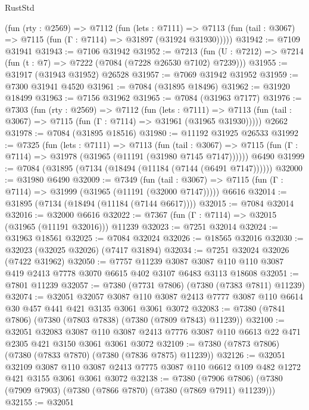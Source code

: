\begin{lexlean}{RustStd}
\begin{coremodule}
    (fun (rty : @2569) =>
    @7112
      (fun (lets : @7111) =>
      @7113 (fun (tail : @3067) => @7115 (fun (Γ : @7114) => @31897 (@31924 @31930)))))
@31942 := @7109 @31941
@31943 := @7106 @31942
@31952 := @7213
    (fun (U : @7212) => @7214 (fun (t : @7) => @7222 (@7084 (@7228 @26530 @7102) @7239)))
@31955 := @31917 (@31943 @31952) @26528
@31957 := @7069 @31942 @31952
@31959 := @7300 @31941 @4520
@31961 := @7084 (@31895 @18496)
@31962 := @31920 @18499
@31963 := @7156 @31962
@31965 := @7084 (@31963 @7177)
@31976 := @7303
    (fun (rty : @2569) =>
    @7112
      (fun (lets : @7111) =>
      @7113 (fun (tail : @3067) => @7115 (fun (Γ : @7114) => @31961 (@31965 @31930)))))
    @2662
@31978 := @7084 (@31895 @18516)
@31980 := @11192 @31925 @26533
@31992 := @7325
    (fun (lets : @7111) =>
    @7113
      (fun (tail : @3067) =>
      @7115 (fun (Γ : @7114) => @31978 (@31965 (@11191 (@31980 @7145 @7147))))))
    @6490
@31999 := @7084 (@31895 (@7134 (@18494 (@11184 (@7144 (@6491 @7147))))))
@32000 := @31980 @6490
@32009 := @7349
    (fun (tail : @3067) => @7115 (fun (Γ : @7114) => @31999 (@31965 (@11191 (@32000 @7147)))))
    @6616
@32014 := @31895 (@7134 (@18494 (@11184 (@7144 @6617))))
@32015 := @7084 @32014
@32016 := @32000 @6616
@32022 := @7367 (fun (Γ : @7114) => @32015 (@31965 (@11191 @32016))) @11239
@32023 := @7251 @32014
@32024 := @31963 @18561
@32025 := @7084 @32024
@32026 := @18565 @32016
@32030 := @32023 (@32025 @32026) (@7417 @31894)
@32034 := @7251 @32024 @32026 (@7422 @31962)
@32050 := @7757
    @11239
    @3087
    @3087
    @110
    @110
    @3087
    @419
    @2413
    @7778
    @3070
    @6615
    @402
    @3107
    @6483
    @3113
    @18608
@32051 := @7801 @11239
@32057 := @7380 (@7731 @7806) (@7380 (@7383 @7811) @11239)
@32074 := @32051
    @32057
    @3087
    @110
    @3087
    @2413
    @7777
    @3087
    @110
    @6614
    @30
    @457
    @441
    @421
    @3135
    @3061
    @3061
    @3072
@32083 := @7380 (@7841 @7806) (@7380 (@7803 @7838) (@7380 (@7809 @7843) @11239))
@32100 := @32051
    @32083
    @3087
    @110
    @3087
    @2413
    @7776
    @3087
    @110
    @6613
    @22
    @471
    @2305
    @421
    @3150
    @3061
    @3061
    @3072
@32109 := @7380 (@7873 @7806) (@7380 (@7833 @7870) (@7380 (@7836 @7875) @11239))
@32126 := @32051
    @32109
    @3087
    @110
    @3087
    @2413
    @7775
    @3087
    @110
    @6612
    @109
    @482
    @1272
    @421
    @3155
    @3061
    @3061
    @3072
@32138 := @7380
    (@7906 @7806)
    (@7380 (@7909 @7903) (@7380 (@7866 @7870) (@7380 (@7869 @7911) @11239)))
@32155 := @32051

\end{coremodule}
\end{lexlean}
